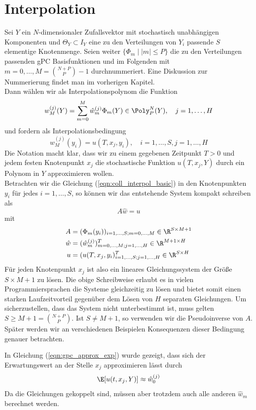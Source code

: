 \section{Interpolation}
Sei $Y$ ein $N$-dimensionaler Zufallsvektor mit stochastisch unabhängigen Komponenten und $\Theta_Y\subset I_Y$ eine zu den Verteilungen von $Y_i$ passende $S$ elementige Knotenmenge. Seien weiter $\lbrace \Phi_m \mid |m|\le P \rbrace$ die zu den Verteilungen passenden gPC Basisfunktionen und im Folgenden mit $m=0,\dots,M=\binom{N+P}{P}-1$ durchnummeriert. Eine Diskussion zur Nummerierung findet man im vorherigen Kapitel.\\
Dann wählen wir als Interpolationspolynom die Funktion
\begin{equation}
\label{eqn:coll_interpol_basic}
w_M^{(j)}(Y)=\sum_{m=0}^M\hat{w}_m^{(j)}\Phi_m(Y)\in\Poly_P^N(Y),\quad j=1,\dots,H
\end{equation}
und fordern als Interpolationsbedingung
\[w_M^{(j)}(y_i)=u(T,x_j,y_i),\quad i=1,\dots,S, j=1,\dots,H\]
Die Notation macht klar, dass wir zu einem gegebenen Zeitpunkt $T>0$ und jedem festen Knotenpunkt $x_j$ die stochastische Funktion $u(T,x_j,Y)$ durch ein Polynom in $Y$ approximieren wollen.\\
Betrachten wir die Gleichung (\ref{eqn:coll_interpol_basic}) in den Knotenpunkten $y_i$ für jedes $i=1,\dots,S$, so können wir das entstehende System kompakt schreiben als
\begin{equation}
\label{eqn:interpol_compact}
A\hat{w}=u
\end{equation}
mit 
\begin{align*}
A&=(\Phi_m(y_i))_{i=1,\dots,S;m=0,\dots,M}\in\R^{S\times M+1}\\
\hat{w}&=(\hat{w}_m^{(j)})^T_{m=0,\dots,M;j=1,\dots,H}\in\R^{M+1\times H}\\
u&=(u(T,x_j,y_i)^T_{i=1,\dots,S;j=1,\dots,H}\in\R^{S\times H}\\
\end{align*}
Für jeden Knotenpunkt $x_j$ ist also ein lineares Gleichungssystem der Größe $S\times M+1$ zu lösen. Die obige Schreibweise erlaubt es in vielen Programmiersprachen die Systeme gleichzeitig zu lösen und bietet somit einen starken Laufzeitvorteil gegenüber dem Lösen von $H$ separaten Gleichungen. Um sicherzustellen, dass das System nicht unterbestimmt ist, muss gelten $S\ge M+1=\binom{N+P}{P}$. Ist $S\neq M+1$, so verwenden wir die Pseudoinverse von $A$. Später werden wir an verschiedenen Beispielen Konsequenzen dieser Bedingung genauer betrachten.
\begin{mathbem}
In Gleichung (\ref{eqn:gpc_approx_exp}) wurde gezeigt, dass sich der Erwartungswert an der Stelle $x_j$ approximieren lässt durch
\[\E[u(t,x_j,Y)]\approx \hat{w}_0^{(j)}\]
Da die Gleichungen gekoppelt sind, müssen aber trotzdem auch alle anderen $\hat{w}_m$ berechnet werden.
\end{mathbem}
